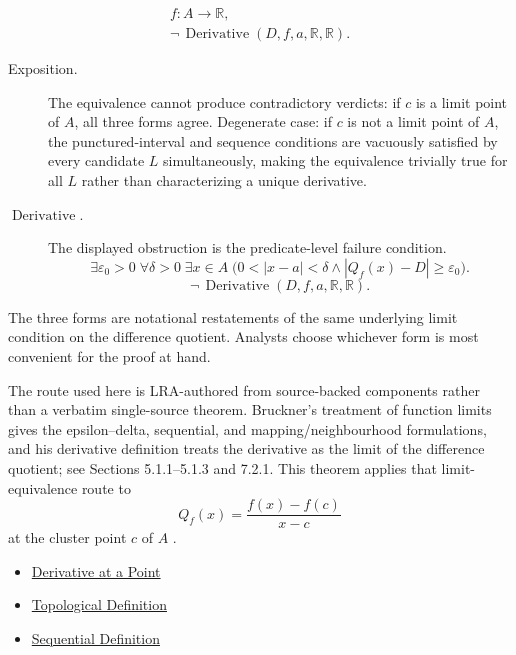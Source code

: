 \begin{remark*}
\[
\begin{aligned}
  f\colon A\to\mathbb{R},\\
\neg\,\operatorname{Derivative}(D,f,a,\mathbb{R},\mathbb{R}).
\end{aligned}
\]
\end{remark*}


\begin{remark*}
\begin{description}
  \item[Exposition.]
The equivalence cannot produce contradictory verdicts: if $c$ is a limit point of $A$, all three forms agree. Degenerate case: if $c$ is not a limit point of $A$, the punctured-interval and sequence conditions are vacuously satisfied by every candidate $L$ simultaneously, making the equivalence trivially true for all $L$ rather than characterizing a unique derivative.


  \item[\(\operatorname{Derivative}.\)]
  The displayed obstruction is the predicate-level failure condition.
  \[
  \exists\varepsilon_0>0\;\forall\delta>0\;\exists x\in A\;\bigl(0<|x-a|<\delta\land |Q_f(x)-D|\ge\varepsilon_0\bigr).
  \]
  \[
  \neg\,\operatorname{Derivative}(D,f,a,\mathbb{R},\mathbb{R}).
  \]
\end{description}
\end{remark*}

\begin{remark*}[Interpretation]
The three forms are notational restatements of the same underlying limit condition on the difference quotient. Analysts choose whichever form is most convenient for the proof at hand.
\end{remark*}

\begin{remark*}
The route used here is LRA-authored from source-backed components rather than
a verbatim single-source theorem. Bruckner's treatment of function limits gives
the epsilon--delta, sequential, and mapping/neighbourhood formulations, and
his derivative definition treats the derivative as the limit of the difference
quotient; see Sections 5.1.1--5.1.3 and 7.2.1.
This theorem applies that limit-equivalence route to
\[
Q_f(x)=\frac{f(x)-f(c)}{x-c}
\]
at the cluster point $c$ of $A$ \cite{ThomsonBrucknerBrucknerElementaryRealAnalysis2}.
\end{remark*}

\begin{dependencies}
\begin{itemize}
  \item \hyperref[def:derivative-at-a-point]{Derivative at a Point}
  \item \hyperref[def:topological-definition-of-derivative-at-a-point]{Topological Definition}
  \item \hyperref[def:sequential-definition-of-derivative-at-a-point]{Sequential Definition}
\end{itemize}
\end{dependencies}

